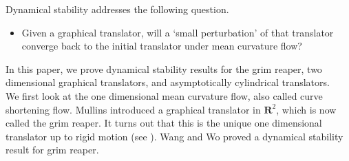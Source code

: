 \documentclass[pdflatex,sn-mathphys-num]{sn-jnl}%
\begin{document}
Dynamical stability addresses the following question.
\begin{itemize}
    \item Given a graphical translator, will a `small perturbation' of that translator converge back to the initial translator under mean curvature flow?
\end{itemize}
In this paper, we prove dynamical stability results for the grim reaper, two dimensional graphical translators, and asymptotically cylindrical translators.\\

We first look at the one dimensional mean curvature flow, also called curve shortening flow. Mullins \cite{mullins1956two} introduced a graphical translator in $\mathbf{R}^2$, which is now called the grim reaper. It turns out that this is the unique one dimensional translator up to rigid motion (see \cite{Halldorsson2010SelfsimilarST}). Wang and Wo \cite{WANG_WO_2011} proved a dynamical stability result for grim reaper.\\
\end{document}
